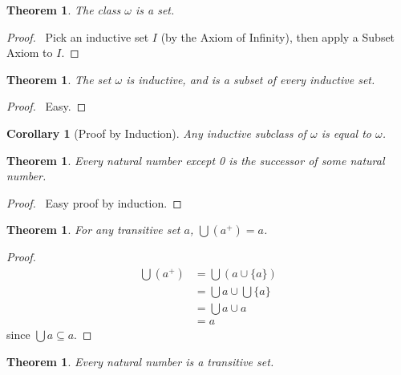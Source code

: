 \documentclass{report}
\let\qed\relax
\newtheorem{theorem}[axiom]{Theorem}
\newtheorem{corollary}{Corollary}[axiom]
\theoremstyle{definition}
\begin{document}
    \begin{theorem}
        The class $\omega$ is a set.
    \end{theorem}

    \begin{proof}
        \pf\ Pick an inductive set $I$ (by the Axiom of Infinity), then apply a Subset Axiom to $I$. \qed
    \end{proof}

    \begin{theorem}
        The set $\omega$ is inductive, and is a subset of every inductive set.
    \end{theorem}

    \begin{proof}
        \pf\ Easy. \qed
    \end{proof}

    \begin{corollary}[Proof by Induction]
        Any inductive subclass of $\omega$ is equal to $\omega$.
    \end{corollary}

    \begin{theorem}
        Every natural number except 0 is the successor of some natural number.
    \end{theorem}

    \begin{proof}
        \pf\ Easy proof by induction. \qed
    \end{proof}

    \begin{theorem}
        \label{theorem:union_transitive_successor}
        For any transitive set $a$, $\bigcup (a^+) = a$.
    \end{theorem}

    \begin{proof}
        \pf
        \begin{align*}
            \bigcup (a^+) & = \bigcup (a \cup \{ a \}) \\
            & = \bigcup a \cup \bigcup \{a\} \\
            & = \bigcup a \cup a \\
            & = a
        \end{align*}
        since $\bigcup a \subseteq a$. \qed
    \end{proof}

    \begin{theorem}
        \label{theorem:natural_number_transitive}
        Every natural number is a transitive set.
    \end{theorem}
\end{document}
